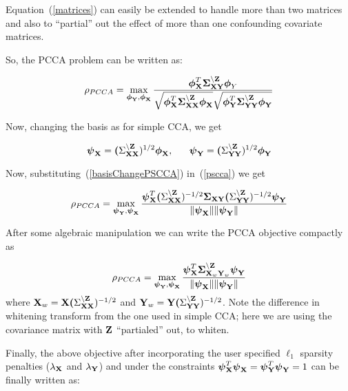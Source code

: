 \documentclass{llncs}
\newcommand{\X}{{\bf X}}
\newcommand{\Y}{{\bf Y}}
\newcommand{\Z}{{\bf Z}}
\newcommand{\bs}{\boldsymbol}
\begin{document}
Equation~(\ref{matrices}) can easily be extended to handle more than two matrices and also to ``partial'' out the effect of more than one confounding covariate matrices.


So, the PCCA problem can be written as:

\begin{equation}
\label{pscca}
\rho_{PCCA}=\max_{{\bs\phi_{\Y}}, {\bs\phi_{\X}}} \frac{\bs\phi_{\X}^T \bs\Sigma_{\X\Y}^{\backslash \Z}\bs\phi_Y}{\sqrt{\bs\phi_{\X}^T\bs\Sigma_{\X\X}^{\backslash \Z}\bs\phi_{\X}}\sqrt{\bs\phi_{\Y}^T\bs\Sigma_{\Y\Y}^{\backslash \Z}\bs\phi_{\Y}}}
\end{equation}


Now, changing the basis as for simple CCA, we get

\begin{equation}
\label{basisChangePSCCA}
\bs\psi_{\X} = \bs(\Sigma_{\X\X}^{\backslash \Z})^{1/2}\bs\phi_{\X}, \;\;\;\;\;\;   \bs\psi_{\Y} = \bs(\Sigma_{\Y\Y}^{\backslash \Z})^{1/2}\bs\phi_{\Y} 
\end{equation}

Now, substituting~(\ref{basisChangePSCCA}) in~(\ref{pscca}) we get 

\begin{equation}
\label{subsPSCCA}
\rho_{PCCA}= \max_{{\bs\psi_{\Y}}, {\bs\psi_{\X}}} \frac{\bs\psi_{\X}^T \bs(\Sigma_{\X\X}^{\backslash \Z})^{-1/2}\bs\Sigma_{\X\Y}\bs(\Sigma_{\Y\Y}^{\backslash \Z})^{-1/2}\bs\psi_{\Y}}{\|\bs\psi_{\X}\| \|\bs\psi_{\Y}\|}
\end{equation}

After some algebraic manipulation we can write the PCCA objective compactly as

\begin{equation}
\label{psccacompact}
\rho_{PCCA}=\max_{{\bs\psi_{\Y}}, {\bs\psi_{\X}}} \frac{\bs\psi_{\X}^T \bs\Sigma_{\X_w\Y_w}^{\backslash \Z}\bs\psi_{\Y}}{\|\bs\psi_{\X}\| \|\bs\psi_{\Y}\|}
\end{equation}
where $\X_w=\X\bs(\Sigma_{\X\X}^{\backslash \Z})^{-1/2}$ and $\Y_w=\Y\bs(\Sigma_{\Y\Y}^{\backslash \Z})^{-1/2}$. Note the difference in whitening transform from the one used in simple CCA; here we are using the covariance matrix with $\Z$ ``partialed'' out, to whiten.


Finally, the above objective after incorporating the user specified $\ell_1$ sparsity penalties ($\lambda_{\X}$ and $\lambda_{\Y}$) and under the constraints $\bs\psi_{\X}^T\bs\psi_{\X}=\bs\psi_{\Y}^T\bs\psi_{\Y}=1$ can be finally written as:
\end{document}
